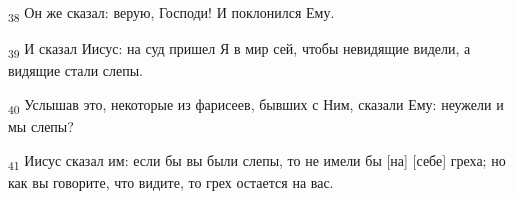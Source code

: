 \begin{tcolorbox}
\textsubscript{38} Он же сказал: верую, Господи! И поклонился Ему.
\end{tcolorbox}
\begin{tcolorbox}
\textsubscript{39} И сказал Иисус: на суд пришел Я в мир сей, чтобы невидящие видели, а видящие стали слепы.
\end{tcolorbox}
\begin{tcolorbox}
\textsubscript{40} Услышав это, некоторые из фарисеев, бывших с Ним, сказали Ему: неужели и мы слепы?
\end{tcolorbox}
\begin{tcolorbox}
\textsubscript{41} Иисус сказал им: если бы вы были слепы, то не имели бы [на] [себе] греха; но как вы говорите, что видите, то грех остается на вас.
\end{tcolorbox}
